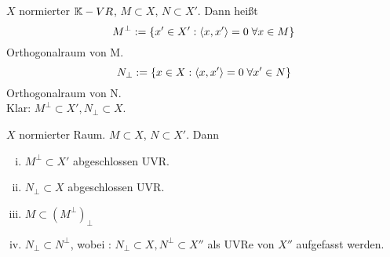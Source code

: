 	\begin{definition}[Orthogonalraum]
		\label{def:3.13}
		$X$ normierter $\mathbb{K}-VR$, $M \subset X$, $N \subset X'$. Dann heißt 
			$$ M^\perp := \{x' \in X' : \left \langle x,x' \right \rangle = 0 \; \forall x\in M\}$$
			Orthogonalraum von M.
			$$ N_\perp := \{ x\in X : \left \langle x,x' \right \rangle = 0 \; \forall x' \in N\}$$
			Orthogonalraum von N. \\
			Klar: $M^\perp \subset X', N_\perp \subset X$.
	\end{definition}

	\begin{lemma}
		\label{lem:3.14}
		$X$ normierter Raum. $M\subset X$, $N \subset X'$. Dann
				\begin{enumerate}[(i)]
					\item $M^\perp \subset X'$ abgeschlossen UVR.
					\item $N_\perp \subset X$ abgeschlossen UVR.
					\item $M \subset (M^\perp)_\perp$
					\item $N_\perp \subset N^\perp$, wobei : $N_\perp \subset X, N^\perp \subset X''$ als UVRe von $X''$ aufgefasst werden.
				\end{enumerate}
	\end{lemma}
%

